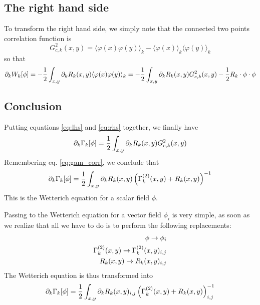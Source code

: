 \subsection{The right hand side}
To transform the right hand side, we simply note that the connected two points correlation function is
\begin{equation}
G_{c,k}^{2}(x,y) = \langle \varphi(x) \varphi(y) \rangle_k - \langle \varphi(x) \rangle_k \langle \varphi(y) \rangle_k
\end{equation}
so that
\begin{equation}
\label{eq:rhs}
\partial_{k} W_k[\phi] = -\frac{1}{2} \int_{x,y} \partial_{k} R_k(x,y) \langle \varphi(x) \varphi(y) \rangle_k = -\frac{1}{2} \int_{x,y} \partial_{k} R_k(x,y) G_{c,k}^2(x,y) - \frac{1}{2} R_k \cdot \phi \cdot \phi
\end{equation}

\subsection{Conclusion}
Putting equations \eqref{eq:lhs} and \eqref{eq:rhs} together, we finally have
\begin{equation}
\partial_{k} \Gamma_k[\phi] = \frac{1}{2} \int_{x,y} \partial_{k} R_k(x,y) G_{c,k}^2(x,y)
\end{equation}
Remembering eq. \eqref{eq:gam_corr}, we conclude that
\begin{equation}
\partial_{k} \Gamma_k[\phi] = \frac{1}{2} \int_{x,y} \partial_{k} R_k(x,y) \left( \Gamma_k^{(2)}(x,y) + R_k(x,y) \right)^{-1}
\end{equation}
This is the Wetterich equation for a scalar field $\phi$.

Passing to the Wetterich equation for a vector field $\phi_i$ is very simple, as soon as we realize that all we have to do is to perform the following replacements:
\begin{align}
\phi \rightarrow \phi_i \\
\Gamma_k^{(2)}(x,y) \rightarrow \Gamma_k^{(2)}(x,y)_{i,j} \\
R_k(x,y) \rightarrow R_k(x,y)_{i,j}
\end{align}
The Wetterich equation is thus transformed into
\begin{equation}
\partial_{k} \Gamma_k[\phi] = \frac{1}{2} \int_{x,y} \partial_{k} R_k(x,y)_{i,j} \left( \Gamma_k^{(2)}(x,y) + R_k(x,y) \right)^{-1}_{i,j}
\end{equation}